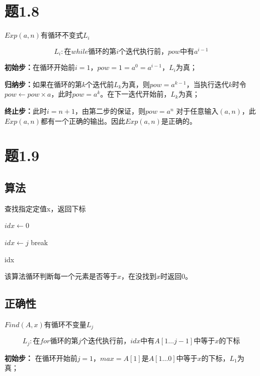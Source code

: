 \documentclass[a4paper,twoside]{article}
\begin{document}
\begin{spacing}{1.2}
\begin{algorithm}
\begin{algorithmic}[1]
	\end{algorithmic}
\end{algorithm}

\section{题1.8}

$Exp(a,n)$有循环不变式$L_i$

$$
L_i: \mbox{在$while$循环的第$i$个迭代执行前，$pow$中有$a^{i-1}$}
$$

\textbf{初始步：}在循环开始前$i=1$，$pow=1=a^0=a^{i-1}$，$L_i$为真；

\textbf{归纳步：}如果在循环的第$k$个迭代前$L_{k}$为真，则$pow=a^{k-1}$，当执行迭代$k时$令$pow \gets pow \times a$，此时$pow=a^{k}$。在下一迭代开始前，$L_k$为真；

\textbf{终止步：}此时$i=n+1$，由第二步的保证，则$pow=a^{n}$
对于任意输入$(a,n)$，此$Exp(a,n)$都有一个正确的输出。因此$Exp(a,n)$是正确的。
\section{题1.9}

\subsection{算法}

\begin{algorithm}
	\caption{查找指定定值x，返回下标}
	\begin{algorithmic}[1]
		\State $idx \gets 0$
		
		\State $idx \gets j$
		\State break
		\EndIf
		\EndFor
		
		\Return idx
		\EndProcedure
		
	\end{algorithmic}
\end{algorithm}

该算法循环判断每一个元素是否等于$x$，在没找到$x$时返回0。

\subsection{正确性}

$Find(A,x)$有循环不变量$L_j$

$$
L_j: \mbox{在$for$循环的第$j$个迭代执行前，$idx$中有$A[1 \dots j-1]$中等于$x$的下标}
$$

\textbf{初始步：} 在循环开始前$j=1$，$max=A[1]$是$A[1 \dots 0]$中等于$x$的下标，$L_1$为真；


\end{spacing}
\end{document}
